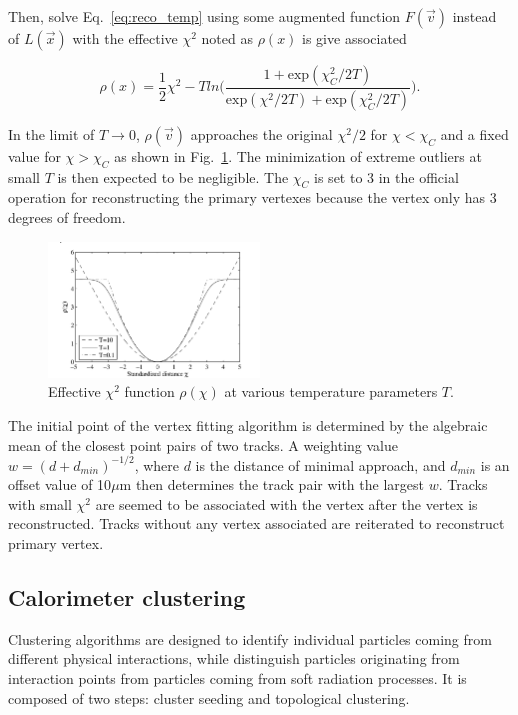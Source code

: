 Then, solve Eq.~\ref{eq:reco_temp} using some augmented function $F(\vec{v})$ instead of $L(\vec{x})$ with the effective $\chi^2$ noted as $\rho(x)$ is give associated
\begin{linenomath}\begin{equation}\label{eq:reco_rho}
    \rho(x) = \frac{1}{2}\chi^2 - Tln\biggl( \frac{1+\mathrm{exp}(\chi^2_C / 2T)}{\mathrm{exp}(\chi^2/2T)+\mathrm{exp}(\chi^2_C/2T)}\biggr).
\end{equation}\end{linenomath}
In the limit of $T\rightarrow 0$, $\rho(\vec{v})$ approaches the original $\chi^2/2$ for $\chi < \chi_C$ and a fixed value for $\chi > \chi_C$ as shown in Fig.~\ref{fig:reco_vertex}.
The minimization of extreme outliers at small $T$ is then expected to be negligible.
The $\chi_C$ is set to 3 in the official operation for reconstructing the primary vertexes because the vertex only has 3 degrees of freedom.
\begin{figure}[H]\centering
    \includegraphics[width=0.5\textwidth]{figure/reco_vertex.png}
    \caption{
        Effective $\chi^2$ function $\rho(\chi)$ at various temperature parameters $T$.
    }
    \label{fig:reco_vertex}
\end{figure}


The initial point of the vertex fitting algorithm is determined by the algebraic mean of the closest point pairs of two tracks.
A weighting value $w=(d+d_{min})^{-1/2}$, where $d$ is the distance of minimal approach, and $d_{min}$ is an offset value of 10$\mu$m then determines the track pair with the largest $w$.
Tracks with small $\chi^2$ are seemed to be associated with the vertex after the vertex is reconstructed.
Tracks without any vertex associated are reiterated to reconstruct primary vertex.

\subsection{Calorimeter clustering}
Clustering algorithms are designed to identify individual particles coming from different physical interactions, while distinguish particles originating from interaction points from particles coming from soft radiation processes.
It is composed of two steps: cluster seeding and topological clustering.

